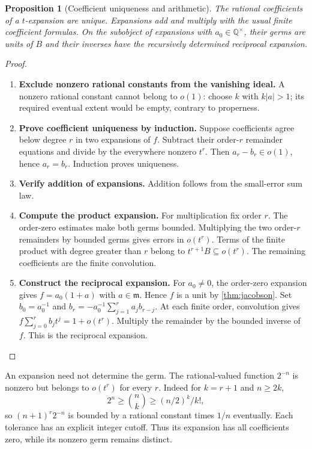 \documentclass[11pt,a4paper]{article}
\numberwithin{algorithm}{section}
\numberwithin{equation}{section}
\newtheorem{proposition}[proposition]{Proposition}
\theoremstyle{definition}
\theoremstyle{remark}
\theoremstyle{plain}
\newcommand{\QQ}{\mathbb Q}
\newcommand{\abs}[1]{\lvert #1\rvert}
\theoremstyle{definition}
\theoremstyle{plain}
\begin{document}
\begin{proposition}[Coefficient uniqueness and arithmetic]
\label{prop:asymptotic-expansion}
The rational coefficients of a $t$-expansion are unique.
Expansions add and multiply with the usual finite
coefficient formulas. On the subobject of expansions with
$a_0\in\QQ^\times$, their germs are units of $B$ and their
inverses have the recursively determined reciprocal expansion.
\end{proposition}
\begin{proof}\leavevmode
\begin{enumerate}[leftmargin=*,align=left]
\item \textbf{Exclude nonzero rational constants from the vanishing ideal.}
A nonzero rational constant cannot belong to $o(1)$:
choose $k$ with $k\abs a>1$; its required eventual extent
would be empty, contrary to properness.

\item \textbf{Prove coefficient uniqueness by induction.}
Suppose coefficients agree below degree $r$ in two
expansions of $f$. Subtract their order-$r$ remainder
equations and divide by the everywhere nonzero $t^r$.
Then $a_r-b_r\in o(1)$, hence $a_r=b_r$.
Induction proves uniqueness.

\item \textbf{Verify addition of expansions.}
Addition follows from the small-error sum law.

\item \textbf{Compute the product expansion.}
For multiplication fix order $r$. The order-zero estimates
make both germs bounded. Multiplying the two order-$r$
remainders by bounded germs gives errors in $o(t^r)$.
Terms of the finite product with degree greater than $r$
belong to $t^{r+1}B\subseteq o(t^r)$.
The remaining coefficients are the finite convolution.

\item \textbf{Construct the reciprocal expansion.}
For $a_0\ne0$, the order-zero expansion gives
$f=a_0(1+a)$ with $a\in\mathfrak m$. Hence $f$ is a unit
by \cref{thm:jacobson}. Set $b_0=a_0^{-1}$ and
$b_r=-a_0^{-1}\sum_{j=1}^r a_jb_{r-j}$.
At each finite order, convolution gives
$f\sum_{j=0}^r b_jt^j=1+o(t^r)$.
Multiply the remainder by the bounded inverse of $f$.
This is the reciprocal expansion.
\end{enumerate}
\end{proof}

An expansion need not determine the germ.
The rational-valued function $2^{-n}$ is nonzero but belongs to
$o(t^r)$ for every $r$. Indeed for $k=r+1$ and $n\ge2k$,
\[
 2^n\ge \binom{n}{k}\ge (n/2)^k/k!,
\]
so $(n+1)^r2^{-n}$ is bounded by a rational constant
times $1/n$ eventually. Each tolerance has an explicit
integer cutoff. Thus its expansion has all coefficients
zero, while its nonzero germ remains distinct.
\end{document}
